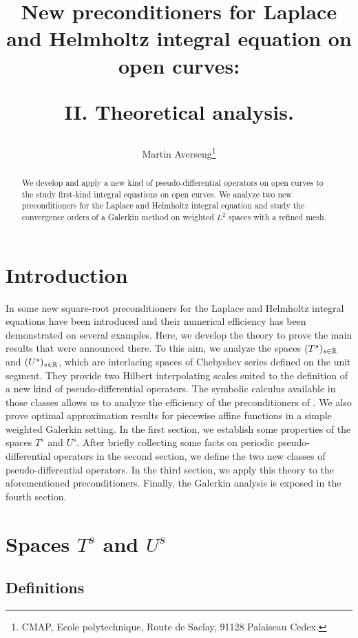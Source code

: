 \documentclass[a4paper]{article}
\title{New preconditioners for Laplace and  Helmholtz integral equation on open curves: \\ \vspace{0.5cm}
	\begin{Large} 
		II. Theoretical analysis.
	\end{Large} }
\author{Martin Averseng\footnote{CMAP, Ecole polytechnique, Route de Saclay, 91128 Palaiseau Cedex.}}
\begin{document}
\maketitle

\begin{abstract}
	We develop and apply a new kind of pseudo-differential operators on open curves to the study first-kind integral equations on open curves. We analyze two new preconditioners for the Laplace and Helmholtz integral equation and study the convergence orders of a Galerkin method on weighted $L^2$ spaces with a refined mesh.  
\end{abstract}

\section*{Introduction}

In \cite{alouges2018new} some new square-root preconditioners for the Laplace and Helmholtz integral equations have been introduced and their numerical efficiency has been demonstrated on several examples. Here, we develop the theory to prove the main results that were announced there. To this aim, we analyze the spaces $(T^s)_{s\in \mathbb{R}}$ and $(U^s)_{s \in \mathbb{R}}$, which are interlacing spaces of Chebyshev series defined on the unit segment. They provide two Hilbert interpolating scales suited to the definition of a new kind of pseudo-differential operators. The symbolic calculus available in those classes allows us to analyze the efficiency of the preconditioners of \cite{alouges2018new}. We also prove optimal approximation results for piecewise affine functions in a simple weighted Galerkin setting. 
In the first section, we establish some properties of the spaces $T^s$ and $U^s$. After briefly collecting some facts on periodic pseudo-differential operators in the second section, we define the two new classes of pseudo-differential operators. In the third section, we apply this theory to the aforementioned preconditioners. Finally, the Galerkin analysis is exposed in the fourth section. 
 
\section{Spaces $T^s$ and $U^s$}

\subsection{Definitions}
\end{document}
